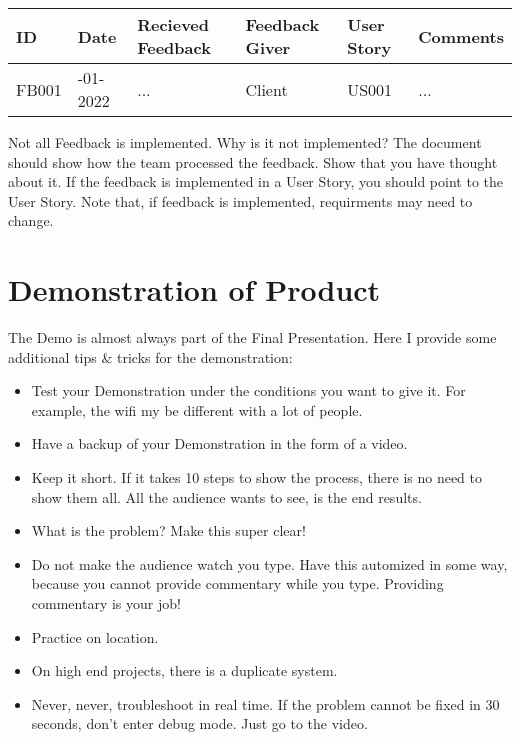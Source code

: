 \documentclass[10pt]{report}
\begin{document}
\medskip
\begin{tabularx}{0.8\textwidth} { 
  | >{\raggedright\arraybackslash}X 
  | >{\raggedright\arraybackslash}X 
  | >{\raggedright\arraybackslash}X 
  | >{\raggedright\arraybackslash}X 
  | >{\raggedright\arraybackslash}X 
  | >{\raggedright\arraybackslash}X | }
 \hline
 ID & Date & Recieved Feedback & Feedback Giver & User Story & Comments \\
 \hline
 FB001 & 01-01-2022 & ... & Client & US001 & ... \\
 \hline
\end{tabularx}
\medskip

\noindent Not all Feedback is implemented. Why is it not implemented? The document should show how the team processed the feedback. Show that you have thought about it. If the feedback is implemented in a User Story, you should point to the User Story. Note that, if feedback is implemented, requirments may need to change.

\newpage

\section{Demonstration of Product}

The Demo is almost always part of the Final Presentation. Here I provide some additional tips \& tricks for the demonstration:

\begin{itemize}
	\item Test your Demonstration under the conditions you want to give it. For example, the wifi my be different with a lot of people.
	\item Have a backup of your Demonstration in the form of a video.
	\item Keep it short. If it takes 10 steps to show the process, there is no need to show them all. All the audience wants to see, is the end results.
	\item What is the problem? Make this super clear!
	\item Do not make the audience watch you type. Have this automized in some way, because you cannot provide commentary while you type. Providing commentary is your job!
	\item Practice on location.
	\item On high end projects, there is a duplicate system.
	\item Never, never, troubleshoot in real time. If the problem cannot be fixed in 30 seconds, don't enter debug mode. Just go to the video.
\end{itemize}
\end{document}
